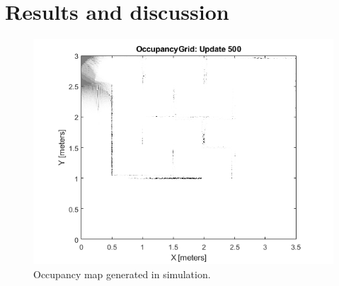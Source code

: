 \documentclass{ieeeaccess}
\begin{document}
\section{Results and discussion}
\label{sec:res}
\begin{figure}
   	\captionsetup{width=\columnwidth}
  	\centering
  	\includegraphics[width=\columnwidth]{./graphics/Prac7_6Occupancy.png}
  	\caption{Occupancy map generated in simulation.}
   	\label{fig:acc1}
\end{figure}
\end{document}
